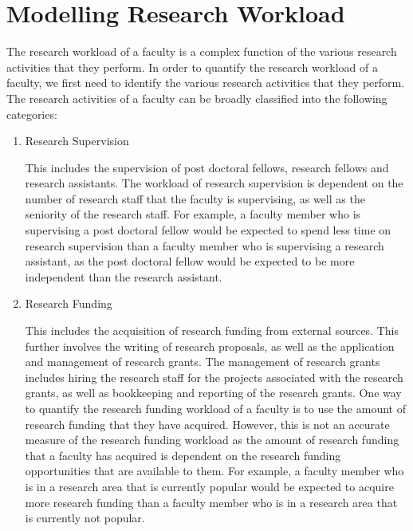 \section{Modelling Research Workload}
\label{sec:modelling_research_workload}

The research workload of a faculty is a complex function of the various research activities that they perform. In order to quantify the research workload of a faculty, we first need to identify the various research activities that they perform. The research activities of a faculty can be broadly classified into the following categories:

\begin{enumerate}

      \item Research Supervision

            This includes the supervision of post doctoral fellows, research fellows and research assistants. The workload of research supervision is dependent on the number of research staff that the faculty is supervising, as well as the seniority of the research staff. For example, a faculty member who is supervising a post doctoral fellow would be expected to spend less time on research supervision than a faculty member who is supervising a research assistant, as the post doctoral fellow would be expected to be more independent than the research assistant.

      \item Research Funding

            This includes the acquisition of research funding from external sources. This further involves the writing of research proposals, as well as the application and management of research grants. The management of research grants includes hiring the research staff for the projects associated with the research grants, as well as bookkeeping and reporting of the research grants. One way to quantify the research funding workload of a faculty is to use the amount of research funding that they have acquired. However, this is not an accurate measure of the research funding workload as the amount of research funding that a faculty has acquired is dependent on the research funding opportunities that are available to them. For example, a faculty member who is in a research area that is currently popular would be expected to acquire more research funding than a faculty member who is in a research area that is currently not popular.


\end{enumerate}
